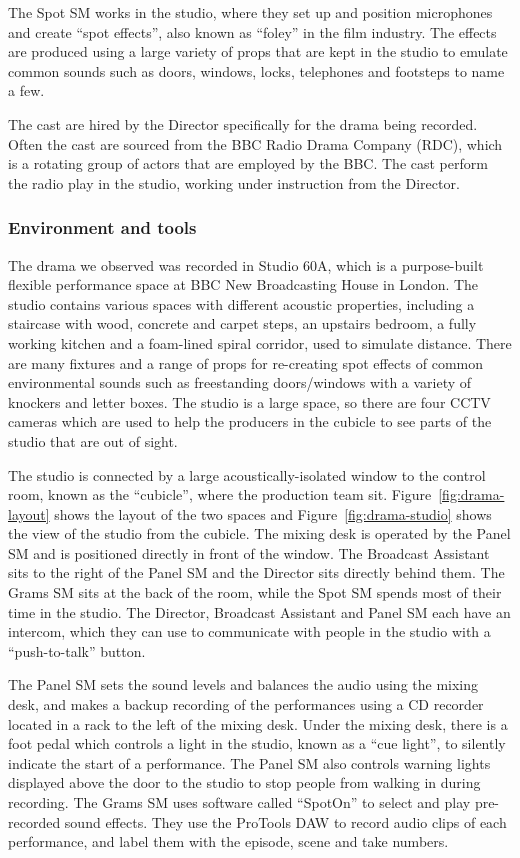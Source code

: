 The Spot SM works in the studio, where they set up and position microphones and create ``spot effects'', also known as
``foley'' in the film industry. The effects are produced using a large variety of props that are kept in the studio to
emulate common sounds such as doors, windows, locks, telephones and footsteps to name a few.

The cast are hired by the Director specifically for the drama being recorded. Often the cast are sourced from the BBC
Radio Drama Company (RDC), which is a rotating group of actors that are employed by the BBC. The cast perform the
radio play in the studio, working under instruction from the Director.

\subsubsection{Environment and tools}
The drama we observed was recorded in Studio 60A, which is a purpose-built flexible performance space at BBC New
Broadcasting House in London. The studio contains various spaces with different acoustic properties, including a
staircase with wood, concrete and carpet steps, an upstairs bedroom, a fully working kitchen and a foam-lined spiral
corridor, used to simulate distance.  There are many fixtures and a range of props for re-creating spot effects of
common environmental sounds such as freestanding doors/windows with a variety of knockers and letter boxes. The studio
is a large space, so there are four CCTV cameras which are used to help the producers in the cubicle to see parts of
the studio that are out of sight. 

The studio is connected by a large acoustically-isolated window to the control room, known as the ``cubicle'', where
the production team sit.  Figure~\ref{fig:drama-layout} shows the layout of the two spaces and
Figure~\ref{fig:drama-studio} shows the view of the studio from the cubicle.  The mixing desk is operated by the Panel
SM and is positioned directly in front of the window.  The Broadcast Assistant sits to the right of the Panel SM and
the Director sits directly behind them. The Grams SM sits at the back of the room, while the Spot SM spends most of
their time in the studio.  The Director, Broadcast Assistant and Panel SM each have an intercom, which they can use to
communicate with people in the studio with a ``push-to-talk'' button.

The Panel SM sets the sound levels and balances the audio using the mixing desk, and makes a backup recording of the
performances using a CD recorder located in a rack to the left of the mixing desk.  Under the mixing desk, there is a
foot pedal which controls a light in the studio, known as a ``cue light'', to silently indicate the start of a
performance. The Panel SM also controls warning lights displayed above the door to the studio to stop people from
walking in during recording.  The Grams SM uses software called ``SpotOn'' \citep{Cridford2005} to select and play
pre-recorded sound effects. They use the ProTools DAW to record audio clips of each performance, and label them with
the episode, scene and take numbers.

